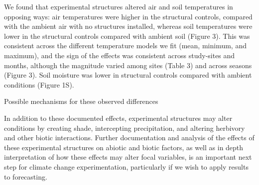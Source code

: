 \documentclass{article}
\begin{document}
\par We found that experimental structures altered air and soil temperatures in opposing ways:  air temperatures were higher in the structural controls, compared with the ambient air with no structures installed, whereas soil temperatures were lower in the structural controls compared with ambient soil (Figure 3). This was consistent across the different temperature models we fit (mean, minimum, and maximum), and the sign of the effects was consistent across study-sites and months, although the magnitude varied among sites (Table 3) and across seasons (Figure 3). Soil moisture was lower in structural controls compared with ambient conditions (Figure 1S). 
\par Possible mechanisms for these observed differences %
\par In addition to these documented effects, experimental structures may alter conditions by creating shade, intercepting precipitation, and altering herbivory and other biotic interactions. Further documentation and analysis of the effects of these experimental structures on abiotic and biotic factors, as well as in depth interpretation of how these effects may alter focal variables, is an important next step for climate change experimentation, particularly if we wish to apply results to forecasting.
\end{document}
